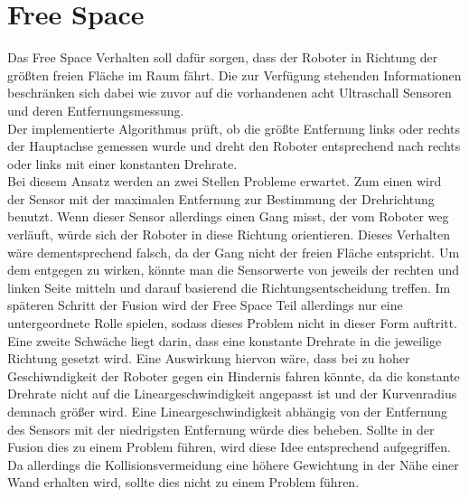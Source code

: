 \documentclass[12pt, a4paper]{report}
\begin{document}
\section{Free Space}

Das Free Space Verhalten soll dafür sorgen, dass der Roboter in Richtung der größten freien Fläche im Raum fährt. Die zur Verfügung stehenden Informationen beschränken sich dabei wie zuvor auf die vorhandenen acht Ultraschall Sensoren und deren Entfernungsmessung.
\\
Der implementierte Algorithmus prüft, ob die größte Entfernung links oder rechts der Hauptachse gemessen wurde und dreht den Roboter entsprechend nach rechts oder links mit einer konstanten Drehrate. 
\\
Bei diesem Ansatz werden an zwei Stellen Probleme erwartet. Zum einen wird der Sensor mit der maximalen Entfernung zur Bestimmung der Drehrichtung benutzt. Wenn dieser Sensor allerdings einen Gang misst, der vom Roboter weg verläuft, würde sich der Roboter in diese Richtung orientieren. Dieses Verhalten wäre dementsprechend falsch, da der Gang nicht der freien Fläche entspricht. Um dem entgegen zu wirken, könnte man die Sensorwerte von jeweils der rechten und linken Seite mitteln und darauf basierend die Richtungsentscheidung treffen. Im späteren Schritt der Fusion wird der Free Space Teil allerdings nur eine untergeordnete Rolle spielen, sodass dieses Problem nicht in dieser Form auftritt.\\
Eine zweite Schwäche liegt darin, dass eine konstante Drehrate in die jeweilige Richtung gesetzt wird. Eine Auswirkung hiervon wäre, dass bei zu hoher Geschiwndigkeit der Roboter gegen ein Hindernis fahren könnte, da die konstante Drehrate nicht auf die Lineargeschwindigkeit angepasst ist und der Kurvenradius demnach größer wird. Eine Lineargeschwindigkeit abhängig von der Entfernung des Sensors mit der niedrigsten Entfernung würde dies beheben. Sollte in der Fusion dies zu einem Problem führen, wird diese Idee entsprechend aufgegriffen. Da allerdings die Kollisionsvermeidung eine höhere Gewichtung in der Nähe einer Wand erhalten wird, sollte dies nicht zu einem Problem führen.
\end{document}

